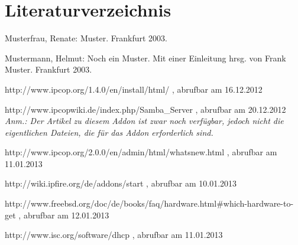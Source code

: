 \documentclass[a4paper,12pt]{scrartcl}
\begin{document}
\section{Literaturverzeichnis}

Musterfrau, Renate: Muster. Frankfurt 2003.


Mustermann, Helmut: Noch ein Muster. Mit einer Einleitung hrsg. von Frank Muster. Frankfurt 2003.

\begin{thebibliography}{99}

 http://www.ipcop.org/1.4.0/en/install/html/ , abrufbar am
16.12.2012

 http://www.ipcopwiki.de/index.php/Samba\_Server ,
abrufbar am 20.12.2012\\
\textit{Anm.: Der Artikel zu diesem Addon ist zwar noch verf\"ugbar, jedoch
nicht die eigentlichen Dateien, die f\"ur das Addon erforderlich sind.}

http://www.ipcop.org/2.0.0/en/admin/html/whatsnew.html , abrufbar am 11.01.2013

 http://wiki.ipfire.org/de/addons/start , abrufbar am
10.01.2013

http://www.freebsd.org/doc/de/books/faq/hardware.html\#which-hardware-to-get ,
abrufbar am 12.01.2013

 http://www.isc.org/software/dhcp , abrufbar am 11.01.2013

\end{thebibliography}
\end{document}
